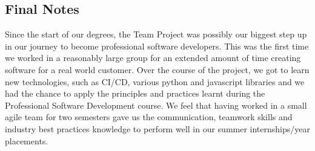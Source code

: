 \documentclass{l3proj}
\begin{document}
\subsection{Final Notes}

Since the start of our degrees, the Team Project was possibly our biggest step up in our journey to become professional software developers. This was the first time we worked in a reasonably large group for an extended amount of time creating software for a real world customer. Over the course of the project, we got to learn new technologies, such as CI/CD, various python and javascript libraries and we had the chance to apply the principles and practices learnt during the Professional Software Development course. We feel that having worked in a small agile team for two semesters gave us the communication, teamwork skills and industry best practices knowledge to perform well in our summer internships/year placements.



\end{document}
